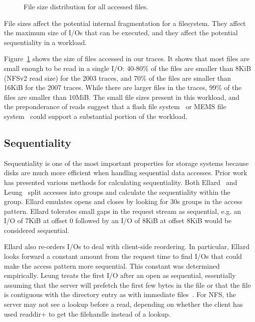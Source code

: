 \begin{figure}
\vspace{-0.2in}
\caption{File size distribution for all accessed files.}
\label{fig:file-size}
\end{figure}

File sizes affect the potential internal fragmentation for a
filesystem.  They affect the maximum size of I/Os that can be
executed, and they affect the potential sequentiality in a workload.

Figure~\ref{fig:file-size} shows the size of files accessed in our
traces.  It shows that most files are small enough to be read in a single I/O: 
40-80\% of the files are smaller than 8KiB (NFSv2 read size) 
for the 2003 traces, and  70\% of the
files are smaller than 16KiB for the 2007 traces.
While there are larger files in the traces, 99\% of
the files are smaller than 10MiB.  The small file sizes present in this
workload, and the preponderance of reads suggest that a flash file
system~\cite{Kawaguchi95aflash-memory} or MEMS file
system~\cite{SchlosserFast04} could support a substantial portion of
the workload.

\subsection{Sequentiality}


Sequentiality is one of the most important properties for storage
systems because disks are much more efficient when handling sequential
data accesses.  Prior work has presented
various methods for calculating sequentiality.  Both
Ellard~\cite{EllardFast03} and Leung~\cite{LeungUsenix08} split accesses
into groups and calculate the sequentiality within the group.  Ellard
emulates opens and closes by looking for 30s groups in the access
pattern.  Ellard tolerates small gaps in the request stream as
sequential, e.g. an I/O of 7KiB at offset 0 followed by an I/O of 8KiB at
offset 8KiB would be considered sequential.  

Ellard also re-orders I/Os
to deal with client-side reordering. In particular, Ellard looks
forward a constant amount from the request time to find I/Os that
could make the access pattern more sequential.  This constant was
determined empirically.  Leung treats the first I/O after an open as
sequential, essentially assuming that the server will prefetch the
first few bytes in the file or that the file is contiguous with the
directory entry as with immediate files~\cite{Mullender84ImmediateFiles}.  
For NFS, the server may not see a lookup before a read, depending on whether
the client has used readdir+ to get the filehandle instead of a lookup.

